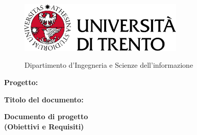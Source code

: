\begin{titlepage}
    \begin{figure}[!htb]
        \includegraphics[width=0.7\textwidth]{img/logo_unitn.png}
        \endminipage
        \hfill
        \begin{flushright}
            \Large
            Dipartimento d'Ingegneria e Scienze dell'informazione
        \end{flushright}
        \endminipage
        \hfill
    \end{figure}

    \vspace{6cm}

    \large
    \textbf{Progetto:}
    \begin{center}
        \Huge
        \color{blue}
        \textbf{\nome}
    \end{center}

    \vspace{1cm}

    \textbf{Titolo del documento:}
    \begin{center}
        \huge
        \color{blue}
        \textbf{Documento di progetto}\\
        \textbf{(Obiettivi e Requisiti)}
    \end{center}


    
\end{titlepage}